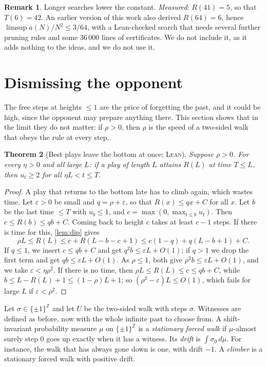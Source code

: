 \documentclass[11pt]{amsart}
\newtheorem{theorem}{Theorem}[section]
\theoremstyle{definition}
\newtheorem{remark}[theorem]{Remark}
\newcommand{\Z}{\mathbb{Z}}
\newcommand{\eps}{\varepsilon}
\newcommand{\LEAN}{\textsc{Lean}}
\begin{document}
\begin{remark}\label{rem:longer}
Longer searches lower the constant. \emph{Measured}: $R(41)=5$, so that $T(6)=42$. An earlier version of this work also derived
$R(64)=6$, hence $\limsup a(N)/N^2\le3/64$, with a Lean-checked search that needs several further pruning rules and some
$36\,000$ lines of certificates. We do not include it, as it adds nothing to the ideas, and we do not use it.
\end{remark}

\section{Dismissing the opponent}\label{sec:climbers}

The free steps at heights $\le1$ are the price of forgetting the past, and it could be high, since the opponent may prepare
anything there. This section shows that in the limit they do not matter: if $\rho>0$, then $\rho$ is the speed of a two-sided walk
that obeys the rule at every step.

\begin{theorem}[Best plays leave the bottom at once; \LEAN]\label{thm:bottom}
Suppose $\rho>0$. For every $\eta>0$ and all large $L$: if a play of length $L$ attains $R(L)$ at time $T\le L$, then
$u_t\ge2$ for all $\eta L<t\le T$.
\end{theorem}

\begin{proof}
A play that returns to the bottom late has to climb again, which wastes time. Let $\eps>0$ be small and $q=\rho+\eps$, so that $R(x)\le qx+C$ for all $x$. Let $b$ be the last time $\le T$ with
$u_b\le1$, and $c=\max(0,\max_{t\le b}u_t)$. Then $c\le R(b)\le qb+C$. Coming back to height $c$ takes at least $c-1$ steps. If there is
time for this, \cref{lem:dip} gives
\[
 \rho L\le R(L)\le c+R(L-b-c+1)\le c(1-q)+q(L-b+1)+C .
\]
If $q\le1$, we insert $c\le qb+C$ and get $q^2b\le\eps L+O(1)$; if $q>1$ we drop the first term and get
$qb\le\eps L+O(1)$. As $\rho\le1$, both give $\rho^2b\le\eps L+O(1)$, and we take $\eps<\eta\rho^2$. If there is no time,
then $\rho L\le R(L)\le c\le qb+C$, while $b\le L-R(L)+1\le(1-\rho)L+1$; so $(\rho^2-\eps)L\le O(1)$, which fails for large
$L$ if $\eps<\rho^2$.
\end{proof}

Let $\sigma\in\{\pm1\}^{\Z}$ and let $U$ be the two-sided walk with steps $\sigma$. Witnesses are defined as before, now with
the whole infinite past to choose from. A shift-invariant probability measure $\mu$ on $\{\pm1\}^{\Z}$ is a \emph{stationary forced
walk} if $\mu$-almost surely step $0$ goes up exactly when it has a witness. Its \emph{drift} is
$\int\sigma_0\,d\mu$. For instance, the walk that has always gone down is one, with drift $-1$. A \emph{climber} is a stationary forced walk
with positive drift.
\end{document}
